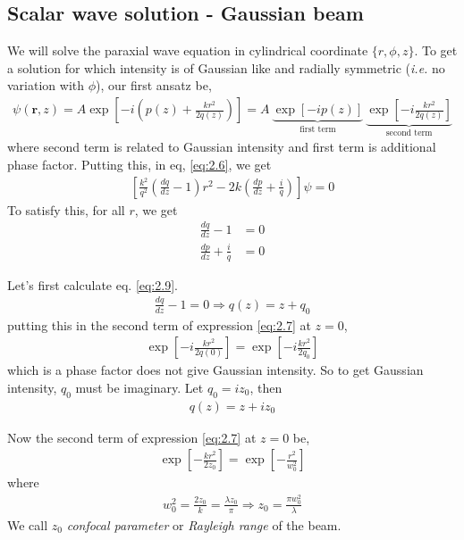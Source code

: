 \documentclass[11pt,a4paper]{article}
\numberwithin{equation}{section}
\begin{document}
\subsection{Scalar wave solution - Gaussian beam}
We will solve the paraxial wave equation in cylindrical coordinate $\{r,\phi,z \}$. 
To get a solution for which intensity is of Gaussian like and radially symmetric (\textit{i.e.} no variation with $\phi$), our first ansatz be, \cite{kogelnik 66}\cite{cornell}
\begin{align}
	\psi(\boldsymbol{r},z)= A \exp\left[-i\left(p(z) + \frac{kr^2}{2q(z)}\right)\right]
	=A\:\underbrace{\exp\left[-ip(z)\right]}_{\text{first term}} \:\underbrace{\exp\left[-i\frac{kr^2}{2q(z)}\right]} _{\text{second term}} \label{eq:2.7}
\end{align} 
where second term is related to Gaussian intensity and first term is additional phase factor. Putting this, in eq, \ref{eq:2.6}, we get
\begin{align}
	\left[\frac{k^2}{q^2}\left(\frac{dq}{dz}-1\right)r^2 -2k\left(\frac{dp}{dz}+\frac{i}{q}\right)\right]\psi= 0
\end{align}
To satisfy this, for all $r$, we get
\begin{align}
	\frac{dq}{dz}-1 &=0 \label{eq:2.9}\\
	\frac{dp}{dz}+\frac{i}{q} &=0\label{eq:2.10}
\end{align}

Let's first calculate eq. \ref{eq:2.9}.
\begin{align}
	\frac{dq}{dz}-1 =0 
	\Rightarrow q(z) = z + q_0 \label{eq:2.11}
\end{align}
putting this in the second term of expression \ref{eq:2.7} at $z=0$,
\begin{align}
	\exp\left[-i\frac{kr^2}{2q(0)}\right] = \exp\left[-i\frac{kr^2}{2q_0}\right]
\end{align}
which is a phase factor does not give Gaussian intensity. So to get Gaussian intensity, $q_0$ must be imaginary. Let $q_0=iz_0$, then 
\begin{align}
	\boxed{q(z) = z + iz_0} \label{eq:2.13}
\end{align}

Now the second term of expression \ref{eq:2.7} at $z=0$ be,
\begin{align}
	\exp\left[-\frac{kr^2}{2z_0}\right] = \exp\left[-\frac{r^2}{w_0^2}\right]
\end{align}
where
\begin{align}
	w_0^2=\frac{2z_0}{k}=\frac{\lambda z_0}{\pi}
	\Rightarrow \boxed{z_0 = \frac{\pi w_0^2}{\lambda} }
\end{align}
We call $z_0$ \textit{confocal parameter} or \textit{Rayleigh range} of the beam.
\end{document}
